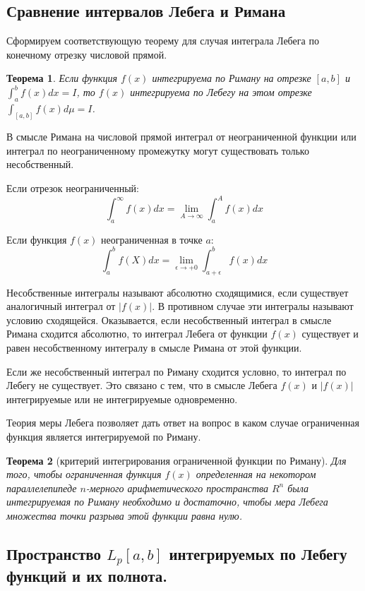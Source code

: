 \documentclass[14pt,a4paper]{extarticle}
\newtheorem{theorem}{Теорема}[section]
\theoremstyle{definition}
\theoremstyle{remark}
\renewcommand{\[}{\begin{dmath*}[compact]}
\renewcommand{\]}{\end{dmath*}}
\newcommand{\ds}{\displaystyle}
\begin{document}
\subsection{Сравнение интервалов Лебега и Римана}

Сформируем соответствующую теорему для случая интеграла Лебега
по конечному отрезку числовой прямой.

\begin{theorem}
  Если функция $f(x)$ интегрируема по Риману на отрезке $[a,b]$ и
  $\ds\int_a^b f(x) dx = I$, то $f(x)$ интегрируема по Лебегу на этом отрезке
  $\ds\int_{[a,b]} f(x) d \mu = I$.
\end{theorem}

В смысле Римана на числовой прямой интеграл от неограниченной функции
или интеграл по неограниченному промежутку могут существовать
только несобственный.

Если отрезок неограниченный:
\[\int_a^\infty f(x)dx = \lim_{A \to \infty} \int_a^A f(x) dx\]

Если функция $f(x)$ неограниченная в точке $a$:
\[\int_a^b f(X)dx = \lim_{\epsilon \to +0} \int_{a+\epsilon}^b f(x) dx\]

Несобственные интегралы называют абсолютно сходящимися,
если существует аналогичный интеграл от $|f(x)|$.
В противном случае эти интегралы называют условию сходящейся.
Оказывается, если несобственный интеграл в смысле Римана сходится абсолютно,
то интеграл Лебега от функции $f(x)$ существует и равен несобственному
интегралу в смысле Римана от этой функции.

Если же несобственный интеграл по Риману сходится условно,
то интеграл по Лебегу не существует.
Это связано с тем, что в смысле Лебега $f(x)$ и $|f(x)|$ интегрируемые
или не интегрируемые одновременно.

Теория меры Лебега позволяет дать ответ на вопрос в каком случае
ограниченная функция является интегрируемой по Риману.

\begin{theorem}[критерий интегрирования ограниченной функции по Риману]
  Для того, чтобы ограниченная функция $f(x)$ определенная на некотором
  параллелепипеде $n$-мерного арифметического пространства $R^n$ была
  интегрируемая по Риману необходимо и достаточно,
  чтобы мера Лебега множества точки разрыва этой функции равна нулю.
\end{theorem}

\subsection{Пространство \texorpdfstring{$L_p[a,b]$}{Lg} интегрируемых
по Лебегу функций и их полнота.}
\end{document}
